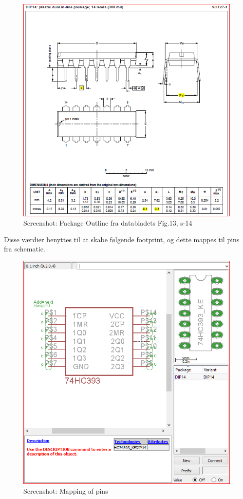 \begin{figure}[H]
	\centering
	\includegraphics[scale=0.6]{../Hardware/Shields/Screenshots/PackageOutline}
	\caption{Screenshot: Package Outline fra databladets Fig.13, s-14 }
	\label{screenshot:PackageOutline}
\end{figure}

	
Disse værdier benyttes til at skabe følgende footprint, og dette mappes til pins fra schematic. 

\begin{figure}[H]
	\centering
	\includegraphics[scale=0.5]{../Hardware/Shields/Screenshots/Mapping}
	\caption{Screenshot: Mapping af pins}
	\label{screenshot:Mapping}
\end{figure}
	
